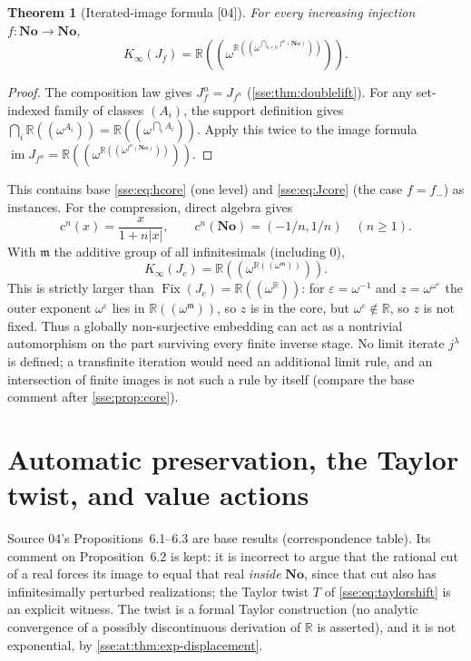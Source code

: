 \documentclass[11pt,a4paper]{article}
\numberwithin{equation}{section}
\theoremstyle{plain}
\newtheorem{theorem}{Theorem}[section]
\theoremstyle{definition}
\theoremstyle{remark}
\newcommand{\No}{\mathbf{No}}
\newcommand{\R}{\mathbb{R}}
\newcommand{\N}{\mathbb{N}}
\newcommand{\Fix}{\operatorname{Fix}}
\newcommand{\im}{\operatorname{im}}
\newcommand{\NF}[1]{\R((\omega^{#1}))}
\newcommand{\src}[1]{\textup{\textsf{\small[#1]}}}%
\begin{document}
\begin{theorem}[Iterated-image formula \src{04}]\label{sse:at:thm:coreformula}
For every increasing injection $f:\No\to\No$,
\begin{equation}\label{sse:at:eq:coreformula}
 K_\infty(J_f)=
 \NF{\NF{\textstyle\bigcap_{n\in\N} f^n(\No)}}.
\end{equation}
\end{theorem}
\begin{proof}
The composition law gives $J_f^n=J_{f^n}$ (\cref{sse:thm:doublelift}). For
any set-indexed family of classes $(A_i)$, the support definition gives
$\bigcap_i\NF{A_i}=\NF{\bigcap_iA_i}$. Apply this twice to the image formula
$\im J_{f^n}=\NF{\NF{f^n(\No)}}$.
\end{proof}
This contains base \eqref{sse:eq:hcore} (one level) and \eqref{sse:eq:Jcore}
(the case $f=f_-$) as instances. For the compression, direct algebra gives
\[
 c^n(x)=\frac{x}{1+n|x|},\qquad c^n(\No)=(-1/n,1/n)\quad(n\ge1).
\]
With $\mathfrak m$ the additive group of all infinitesimals (including $0$),
\begin{equation}\label{sse:at:eq:corec}
 K_\infty(J_c)=\NF{\NF{\mathfrak m}}.
\end{equation}
This is strictly larger than $\Fix(J_c)=\NF{\R}$: for $\varepsilon=\omega^{-1}$
and $z=\omega^{\omega^\varepsilon}$ the outer exponent $\omega^\varepsilon$
lies in $\NF{\mathfrak m}$, so $z$ is in the core, but $\omega^\varepsilon\notin\R$,
so $z$ is not fixed. Thus a globally non-surjective embedding can act as a
nontrivial automorphism on the part surviving every finite inverse stage.
No limit iterate $j^\lambda$ is defined; a transfinite iteration would need
an additional limit rule, and an intersection of finite images is not such
a rule by itself (compare the base comment after \cref{sse:prop:core}).

\section{Automatic preservation, the Taylor twist, and value actions}\label{sse:at:sec:automatic}

Source 04's Propositions~6.1--6.3 are base results (correspondence table).
Its comment on Proposition~6.2 is kept: it is incorrect to argue that the
rational cut of a real forces its image to equal that real \emph{inside}
$\No$, since that cut also has infinitesimally perturbed realizations; the
Taylor twist $T$ of \eqref{sse:eq:taylorshift} is an explicit witness. The
twist is a formal Taylor construction (no analytic convergence of a possibly
discontinuous derivation of $\R$ is asserted), and it is not exponential, by
\cref{sse:at:thm:exp-displacement}.
\end{document}
